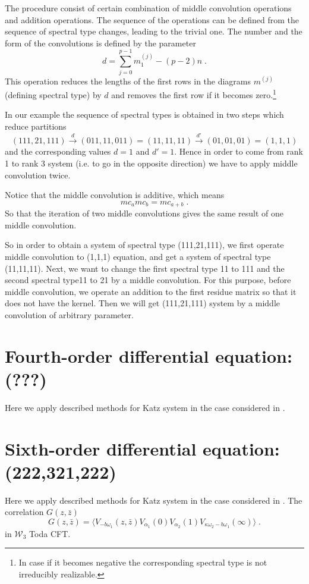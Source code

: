 \documentclass[12pt,a4paper]{article}
\def\be{\begin{equation}}
\def\ee{\end{equation}}
\newcommand{\< }{{\langle}}
\renewcommand{\>}{{\rangle}}
\newcommand{\cW}{\mathcal{W}}
\newcommand{\0}{\textbf{0.}}
\newcommand{\1}{\textbf{1.}}
\newcommand{\2}{\textbf{2.}}
\newcommand{\3}{\textbf{3.}}
\newcommand{\4}{\textbf{4.}}
\newcommand{\5}{\textbf{5.}}
\newcommand{\6}{\textbf{6.}}
\newcommand{\7}{\textbf{7.}}
\newcommand{\8}{\textbf{8.}}
\newcommand{\9}{\textbf{9.}}
\begin{document}
The procedure consist of certain combination of middle convolution operations and addition operations.
The sequence of the operations  can be defined from the sequence  of spectral type changes, leading to the trivial one.
The number and the form of the convolutions is defined  by the parameter
\be 
d=\sum_{j=0}^{p-1} m_1^{(j)}-(p-2)n\;.
\ee
This operation reduces the lengths of the first rows in the diagrams $m^{(j)}$ (defining  spectral type) by $d$ and removes the first row if it becomes zero.\footnote{In case if it becomes negative the corresponding spectral type is not irreducibly realizable.}

In our example the sequence of spectral types is obtained in two steps which reduce partitions 
\be (111,21,111)\xrightarrow{d}(011,11,011)=(11,11,11)\xrightarrow{d'}(01,01,01)=(1,1,1)
\ee
and the corresponding values $d=1$ and $d'=1$. Hence in order to come from rank 1 to rank 3 system
(i.e. to go in the opposite direction) we have to apply middle convolution twice.

Notice that the middle convolution is additive, which means
\be
mc_a mc_b = mc_{a+b}\;.
\ee
So that the iteration of two middle convolutions gives the same result of one middle convolution.

So in order to obtain a system of spectral type (111,21,111),
we first operate middle convolution to (1,1,1) equation, and get a system of spectral type (11,11,11).
Next, we want to change the first spectral type 11 to 111 
and the second spectral type11 to 21 by a middle convolution.
For this purpose, before middle convolution,
we operate an addition to the first residue matrix so that it does not have the kernel.
Then we will get (111,21,111) system by a middle convolution of arbitrary parameter. 


\section{Fourth-order differential equation: (???)}
Here we apply described methods for Katz system in the case considered in \cite{Belavin:2016qaa}.

\section{Sixth-order differential equation: (222,321,222)}
Here we apply described methods for Katz system in the case considered in \cite{Belavin:2016wlo}.
The  correlation $G(z,\bar{z})$  
\be
G(z,\bar{z})=\langle V_{-b \omega_1}(z,\bar{z}) V_{\alpha_1}(0) V_{\alpha_2}(1)V_{\kappa \omega_2-b \omega_1}(\infty)\rangle\;.
\ee
in $\cW_3$ Toda CFT.
\end{document}
